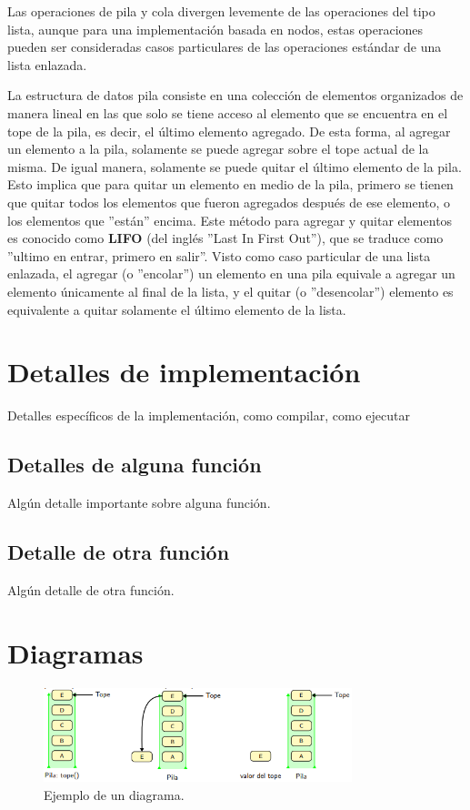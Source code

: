 \documentclass[titlepage,a4paper]{article}
\begin{document}
Las operaciones de pila y cola divergen levemente de las operaciones del tipo lista, aunque para una implementación basada en nodos, estas operaciones pueden ser consideradas casos particulares de las operaciones estándar de una lista enlazada.

La estructura de datos pila consiste en una colección de elementos organizados de manera lineal en las que solo se tiene acceso al elemento que se encuentra en el tope de la pila, es decir, el último elemento agregado. De esta forma, al agregar un elemento a la pila, solamente se puede agregar sobre el tope actual de la misma. De igual manera, solamente se puede quitar el último elemento de la pila. Esto implica que para quitar un elemento en medio de la pila, primero se tienen que quitar todos los elementos que fueron agregados después de ese elemento, o los elementos que ''están'' encima. Este método para agregar y quitar elementos es conocido como \textbf{LIFO} (del inglés ''Last In First Out''), que se traduce como ''ultimo en entrar, primero en salir''. Visto como caso particular de una lista enlazada, el agregar (o ''encolar'') un elemento en una pila equivale a agregar un elemento únicamente al final de la lista, y el quitar (o ''desencolar'') elemento es equivalente a quitar solamente el último elemento de la lista.


\section{Detalles de implementación}\label{sec:implementacion}

Detalles específicos de la implementación, como compilar, como ejecutar



\subsection{Detalles de alguna función}
Algún detalle importante sobre alguna función.

\subsection{Detalle de otra función}
Algún detalle de otra función.

\section{Diagramas}\label{sec:diagramas}

\begin{figure}[H]
\centering
\includegraphics[width=0.8\textwidth]{diagrama1.png}
\caption{\label{fig:seq01}Ejemplo de un diagrama.}
\end{figure}
\end{document}
